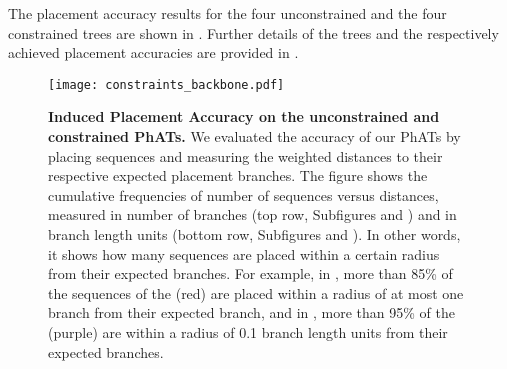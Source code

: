 The placement accuracy results for the four unconstrained and the four constrained trees
are shown in .
Further details of the trees and the respectively achieved placement accuracies
are provided in .

\begin{figure}[hpbt]
    \centering
    \texttt{[image: constraints\_backbone.pdf]}
    \begin{subfigure}{0pt}
        \label{fig:constraints_backbone:sub:edge_unconstr}
    \end{subfigure}
    \begin{subfigure}{0pt}
        \label{fig:constraints_backbone:sub:edge_constr}
    \end{subfigure}
    \begin{subfigure}{0pt}
        \label{fig:constraints_backbone:sub:branch_unconstr}
    \end{subfigure}
    \begin{subfigure}{0pt}
        \label{fig:constraints_backbone:sub:branch_constr}
    \end{subfigure}
    \caption[Induced Placement Accuracy on the \acsp{PhAT}]{
        \textbf{Induced Placement Accuracy on the unconstrained and constrained \acfp{PhAT}.}
        We evaluated the accuracy of our \acp{PhAT} by placing sequences
        and measuring the weighted distances to their respective expected placement branches.
        The figure shows the cumulative frequencies of number of sequences versus distances,
        measured in number of branches (top row, Subfigures  and
        )
        and in branch length units (bottom row, Subfigures  and
        ).
        In other words, it shows how many sequences are placed
        within a certain radius from their expected branches.
        For example, in ,
        more than 85\% of the sequences of the  (red) are placed
        within a radius of at most one branch from their expected branch,
        and in , more than 95\% of the  (purple)
        are within a radius of 0.1 branch length units from their expected branches.
}
\end{figure}
